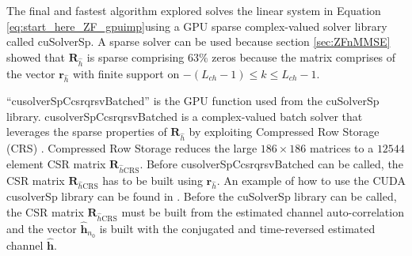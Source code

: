 The final and fastest algorithm explored solves the linear system in Equation \eqref{eq:start_here_ZF_gpuimp}using a GPU sparse complex-valued solver library called cuSolverSp.
A sparse solver can be used because section \ref{sec:ZFnMMSE} showed that $\mathbf{R}_{\hat{h}}$ is sparse comprising $63\%$ zeros because the matrix comprises of the vector $\mathbf{r}_{\hat{h}}$ with finite support on $-(L_{ch}-1) \leq k \leq L_{ch}-1$.

``cusolverSpCcsrqrsvBatched'' is the GPU function used from the cuSolverSp library.
cusolverSpCcsrqrsvBatched is a complex-valued batch solver that leverages the sparse properties of $\mathbf{R}_{\hat{h}}$ by exploiting Compressed Row Storage (CRS) \cite{wiki:Sparse_matrix}.
Compressed Row Storage reduces the large $186\times186$ matrices to a $12544$ element CSR matrix $\mathbf{R}_{\hat{h}\text{CRS}}$.
Before cusolverSpCcsrqrsvBatched can be called, the CSR matrix $\mathbf{R}_{\hat{h}\text{CRS}}$ has to be built using $\mathbf{r}_{\hat{h}}$.
An example of how to use the CUDA cusolverSp library can be found in \cite{CUDA_toolkit_doc}.
Before the cuSolverSp library can be called, the CSR matrix $\mathbf{R}_{\hat{h}\text{CRS}}$ must be built from the estimated channel auto-correlation and the vector $\hat{\mathbf{h}}_{n_0}$ is built with the conjugated and time-reversed estimated channel $\mathbf{\hat{h}}$. 


